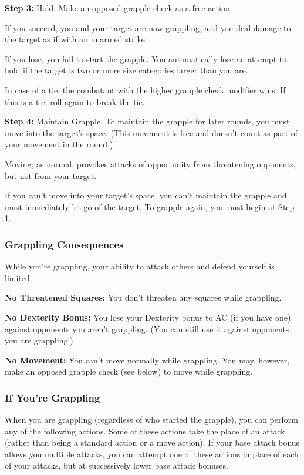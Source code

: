 \textbf{Step 3:} Hold. Make an opposed grapple check as a free action.

If you succeed, you and your target are now grappling, and you deal damage to the 
target as if with an unarmed strike.

If you lose, you fail to start the grapple. You automatically lose an attempt to 
hold if the target is two or more size categories larger than you are.

In case of a tie, the combatant with the higher grapple check modifier wins. If 
this is a tie, roll again to break the tie.

\textbf{Step 4:} Maintain Grapple. To maintain the grapple for later rounds, you 
must move into the target's space. (This movement is free and doesn't count as 
part of your movement in the round.)

Moving, as normal, provokes attacks of opportunity from threatening opponents, 
but not from your target.

If you can't move into your target's space, you can't maintain the grapple and 
must immediately let go of the target. To grapple again, you must begin at Step 1.

\subsubsection{Grappling Consequences}

While you're grappling, your ability to attack others and defend yourself is limited.

\textbf{No Threatened Squares:} You don't threaten any squares while grappling.

\textbf{No Dexterity Bonus:} You lose your Dexterity bonus to AC (if you have one) 
against opponents you aren't grappling. (You can still use it against opponents 
you are grappling.)

\textbf{No Movement:} You can't move normally while grappling. You may, however, 
make an opposed grapple check (see below) to move while grappling.

\subsubsection{If You're Grappling}

When you are grappling (regardless of who started the grapple), you can perform 
any of the following actions. Some of these actions take the place of an attack 
(rather than being a standard action or a move action). If your base attack bonus 
allows you multiple attacks, you can attempt one of these actions in place of each 
of your attacks, but at successively lower base attack bonuses.

